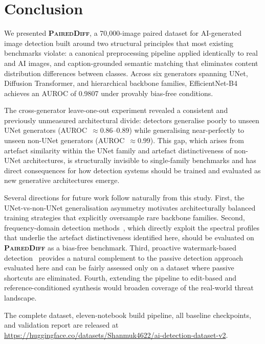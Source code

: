 \documentclass[journal]{IEEEtran}
\newcommand{\datasetname}{\textsc{PairedDiff}}
\begin{document}
\section{Conclusion}
\label{sec:conclusion}

We presented \textbf{\datasetname}, a 70{,}000-image paired dataset
for AI-generated image detection built around two structural
principles that most existing benchmarks violate: a canonical
preprocessing pipeline applied identically to real and AI images,
and caption-grounded semantic matching that eliminates content
distribution differences between classes.
Across six generators spanning UNet, Diffusion Transformer, and
hierarchical backbone families, EfficientNet-B4 achieves an AUROC
of 0.9807 under provably bias-free conditions.

The cross-generator leave-one-out experiment revealed a consistent
and previously unmeasured architectural divide: detectors generalise
poorly to unseen UNet generators (AUROC~$\approx 0.86$--$0.89$)
while generalising near-perfectly to unseen non-UNet generators
(AUROC~$\approx 0.99$).
This gap, which arises from artefact similarity within the UNet
family and artefact distinctiveness of non-UNet architectures, is
structurally invisible to single-family benchmarks and has direct
consequences for how detection systems should be trained and evaluated
as new generative architectures emerge.

Several directions for future work follow naturally from this study.
First, the UNet-vs-non-UNet generalisation asymmetry motivates
architecturally balanced training strategies that explicitly
oversample rare backbone families.
Second, frequency-domain detection methods~\cite{corvi2023detection},
which directly exploit the spectral profiles that underlie the
artefact distinctiveness identified here, should be evaluated on
\textbf{\datasetname} as a bias-free benchmark.
Third, proactive watermark-based detection~\cite{jiang2024passive}
provides a natural complement to the passive detection approach
evaluated here and can be fairly assessed only on a dataset where
passive shortcuts are eliminated.
Fourth, extending the pipeline to edit-based and
reference-conditioned synthesis would broaden coverage of the
real-world threat landscape.

The complete dataset, eleven-notebook build pipeline, all baseline
checkpoints, and validation report are released at
\url{https://huggingface.co/datasets/Shanmuk4622/ai-detection-dataset-v2}.

\appendix



\end{document}
